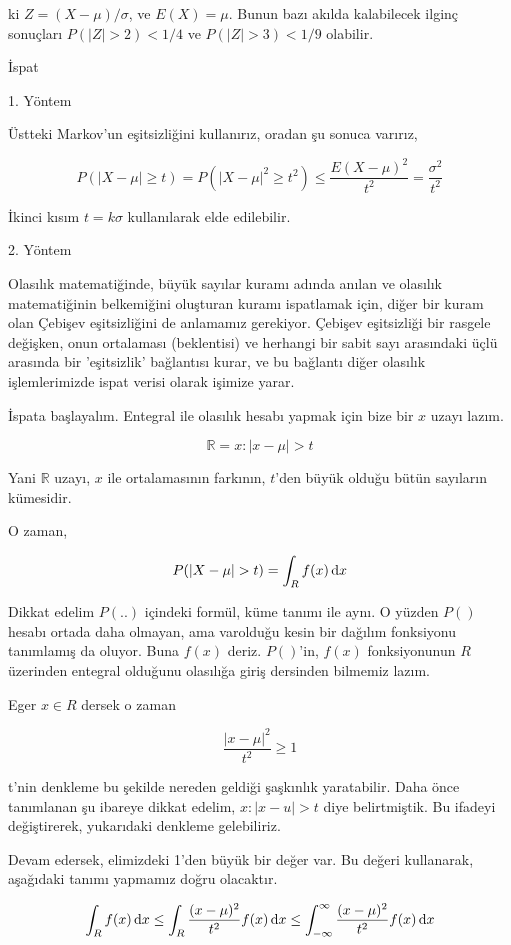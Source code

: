 \documentclass[12pt,fleqn]{article}\usepackage{../../common}
\begin{document}
ki $Z = (X-\mu)/\sigma$, ve $E(X) = \mu$. Bunun bazı akılda kalabilecek
ilginç sonuçları $P(|Z| > 2) < 1/4$ ve $P(|Z| > 3) < 1/9$ olabilir.

İspat

1. Yöntem

Üstteki Markov'un eşitsizliğini kullanırız, oradan şu sonuca varırız, 

$$ 
P(|X-\mu| \ge t) = P(|X-\mu|^2 \ge t^2 ) \le \frac{E(X-\mu)^2}{t^2} 
= \frac{\sigma^2}{t^2}  
$$

İkinci kısım $t=k\sigma$ kullanılarak elde edilebilir.

2. Yöntem

Olasılık matematiğinde, büyük sayılar kuramı adında anılan ve olasılık
matematiğinin belkemiğini oluşturan kuramı ispatlamak için, diğer bir kuram
olan Çebişev eşitsizliğini de anlamamız gerekiyor. Çebişev eşitsizliği bir
rasgele değişken, onun ortalaması (beklentisi) ve herhangi bir sabit sayı
arasındaki üçlü arasında bir 'eşitsizlik' bağlantısı kurar, ve bu bağlantı
diğer olasılık işlemlerimizde ispat verisi olarak işimize yarar.



İspata başlayalım. Entegral ile olasılık hesabı yapmak için bize bir $x$
uzayı lazım.

$$ \mathbb{R} = {x: |x-\mu| > t} $$

Yani $\mathbb{R}$ uzayı, $x$ ile ortalamasının farkının, $t$'den büyük olduğu bütün
sayıların kümesidir.

O zaman, 

$$ P(|X-\mu| > t) = \int_R f(x) \,\mathrm{d} x $$

Dikkat edelim $P(..)$ içindeki formül, küme tanımı ile aynı. O yüzden $P()$
hesabı ortada daha olmayan, ama varolduğu kesin bir dağılım fonksiyonu
tanımlamış da oluyor. Buna $f(x)$ deriz. $P()$'in, $f(x)$ fonksiyonunun $R$
üzerinden entegral olduğunu olasılığa giriş dersinden bilmemiz lazım. 

Eger $x \in R$ dersek o zaman

$$ \frac{|x-\mu|^2}{t^2} \ge 1 $$

t'nin denkleme bu şekilde nereden geldiği şaşkınlık yaratabilir. Daha önce
tanımlanan şu ibareye dikkat edelim, $x: |x-u| > t$ diye belirtmiştik. Bu
ifadeyi değiştirerek, yukarıdaki denkleme gelebiliriz.

Devam edersek, elimizdeki 1'den büyük bir değer var. Bu değeri kullanarak,
aşağıdaki tanımı yapmamız doğru olacaktır.

$$
\int_R f(x) \,\mathrm{d} x \le \int_R \frac{(x-\mu)^2}{t^2}f(x) \,\mathrm{d} x \le
\int_{-\infty}^{\infty}\frac{(x-\mu)^2}{t^2}f(x) \,\mathrm{d} x 
$$
\end{document}
